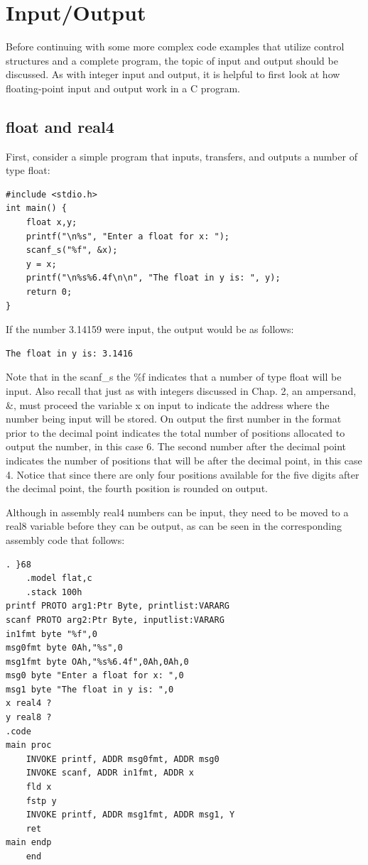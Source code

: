 \documentclass[10pt]{book}
\begin{document}
\section{Input/Output}
Before continuing with some more complex code examples that utilize control structures and a complete program, the topic of input and output should be discussed. As with integer input and output, it is helpful to first look at how floating-point input and output work in a C program.

\subsection{float and real4}
First, consider a simple program that inputs, transfers, and outputs a number of type float:
\begin{verbatim}
#include <stdio.h>
int main() {
    float x,y;
    printf("\n%s", "Enter a float for x: ");
    scanf_s("%f", &x);
    y = x;
    printf("\n%s%6.4f\n\n", "The float in y is: ", y);
    return 0;
}
\end{verbatim}

If the number 3.14159 were input, the output would be as follows:

\begin{verbatim}
The float in y is: 3.1416
\end{verbatim}

Note that in the scanf\_s the \%f indicates that a number of type float will be input. Also recall that just as with integers discussed in Chap. 2, an ampersand, \&, must proceed the variable x on input to indicate the address where the number being input will be stored. On output the first number in the format prior to the decimal point indicates the total number of positions allocated to output the number, in this case 6. The second number after the decimal point indicates the number of positions that will be after the decimal point, in this case 4. Notice that since there are only four positions available for the five digits after the decimal point, the fourth position is rounded on output.

Although in assembly real4 numbers can be input, they need to be moved to a real8 variable before they can be output, as can be seen in the corresponding assembly code that follows:

\begin{verbatim}
. }68
    .model flat,c
    .stack 100h
printf PROTO arg1:Ptr Byte, printlist:VARARG
scanf PROTO arg2:Ptr Byte, inputlist:VARARG
in1fmt byte "%f",0
msg0fmt byte 0Ah,"%s",0
msg1fmt byte OAh,"%s%6.4f",0Ah,0Ah,0
msg0 byte "Enter a float for x: ",0
msg1 byte "The float in y is: ",0
x real4 ?
y real8 ?
.code
main proc
    INVOKE printf, ADDR msg0fmt, ADDR msg0
    INVOKE scanf, ADDR in1fmt, ADDR x
    fld x
    fstp y
    INVOKE printf, ADDR msg1fmt, ADDR msg1, Y
    ret
main endp
    end
\end{verbatim}
\end{document}
